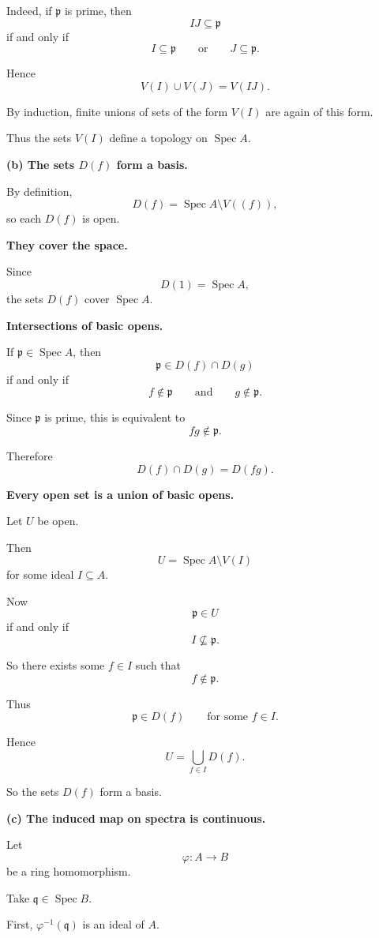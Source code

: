 \documentclass[12pt,a4paper]{article}
\DeclareMathOperator{\Spec}{Spec}
\theoremstyle{plain}
\theoremstyle{definition}      %
\begin{document}
	Indeed, if \(\mathfrak p\) is prime, then
	\[
	IJ\subseteq \mathfrak p
	\]
	if and only if
	\[
	I\subseteq \mathfrak p
	\qquad\text{or}\qquad
	J\subseteq \mathfrak p.
	\]
	
	Hence
	\[
	V(I)\cup V(J)=V(IJ).
	\]
	
	By induction, finite unions of sets of the form \(V(I)\) are again of this form.
	
	Thus the sets \(V(I)\) define a topology on \(\Spec A\).
	
	\bigskip
	\textbf{(b) The sets \(D(f)\) form a basis.}
	
	By definition,
	\[
	D(f)=\Spec A\setminus V((f)),
	\]
	so each \(D(f)\) is open.
	
	\medskip
	\textbf{They cover the space.}
	
	Since
	\[
	D(1)=\Spec A,
	\]
	the sets \(D(f)\) cover \(\Spec A\).
	
	\medskip
	\textbf{Intersections of basic opens.}
	
	If \(\mathfrak p\in \Spec A\), then
	\[
	\mathfrak p\in D(f)\cap D(g)
	\]
	if and only if
	\[
	f\notin \mathfrak p
	\qquad\text{and}\qquad
	g\notin \mathfrak p.
	\]
	
	Since \(\mathfrak p\) is prime, this is equivalent to
	\[
	fg\notin \mathfrak p.
	\]
	
	Therefore
	\[
	D(f)\cap D(g)=D(fg).
	\]
	
	\medskip
	\textbf{Every open set is a union of basic opens.}
	
	Let \(U\) be open.
	
	Then
	\[
	U=\Spec A\setminus V(I)
	\]
	for some ideal \(I\subseteq A\).
	
	Now
	\[
	\mathfrak p\in U
	\]
	if and only if
	\[
	I\nsubseteq \mathfrak p.
	\]
	
	So there exists some \(f\in I\) such that
	\[
	f\notin \mathfrak p.
	\]
	
	Thus
	\[
	\mathfrak p\in D(f)
	\qquad\text{for some }f\in I.
	\]
	
	Hence
	\[
	U=\bigcup_{f\in I} D(f).
	\]
	
	So the sets \(D(f)\) form a basis.
	
	\bigskip
	\textbf{(c) The induced map on spectra is continuous.}
	
	Let
	\[
	\varphi:A\longrightarrow B
	\]
	be a ring homomorphism.
	
	Take \(\mathfrak q\in \Spec B\).
	
	First, \(\varphi^{-1}(\mathfrak q)\) is an ideal of \(A\).
	
\end{document}
